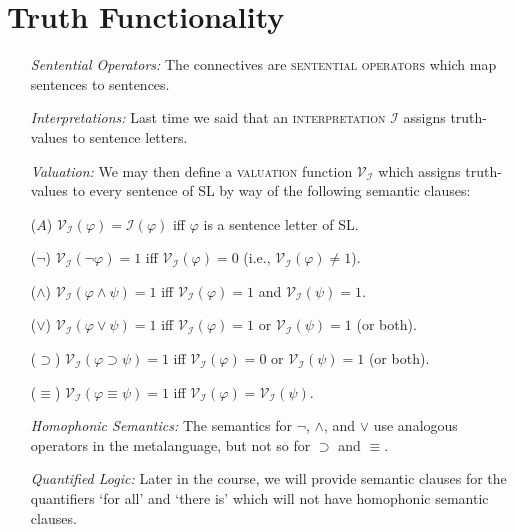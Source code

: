 \documentclass[a4paper, 11pt]{article} %
\newcommand{\I}{\mathcal{I}}
\newcommand{\V}[1]{\mathcal{V}_{#1}} %
\begin{document}
\section*{Truth Functionality}

\begin{enumerate}[leftmargin=1.5in,labelsep=.15in] %
  \item[\it Sentential Operators:] The connectives are \textsc{sentential operators} which map sentences to sentences.
  \item[\it Interpretations:] Last time we said that an \textsc{interpretation} $\I$ assigns truth-values to sentence letters.
  \item[\it Valuation:] We may then define a \textsc{valuation} function $\V{\I}$ which assigns truth-values to every sentence of SL by way of the following semantic clauses:
    \item[($A$)] $\V{\I}(\varphi)=\I(\varphi)$ iff $\varphi$ is a sentence letter of SL.
    \item[($\neg$)] $\V{\I}(\neg\varphi)=1$ iff $\V{\I}(\varphi)=0$ (i.e., $\V{\I}(\varphi)\neq 1$).
    \item[($\wedge$)] $\V{\I}(\varphi \wedge \psi)=1$ iff $\V{\I}(\varphi)=1$ and $\V{\I}(\psi)=1$.
    \item[($\vee$)] $\V{\I}(\varphi \vee \psi)=1$ iff $\V{\I}(\varphi)=1$ or $\V{\I}(\psi)=1$ (or both).
    \item[($\supset$)] $\V{\I}(\varphi \supset \psi)=1$ iff $\V{\I}(\varphi)=0$ or $\V{\I}(\psi)=1$ (or both).
    \item[($\equiv$)] $\V{\I}(\varphi \equiv \psi)=1$ iff $\V{\I}(\varphi)=\V{\I}(\psi)$.
  \item[\it Homophonic Semantics:] The semantics for $\neg$, $\wedge$, and $\vee$ use analogous operators in the metalanguage, but not so for $\supset$ and $\equiv$. 
  \item[\it Quantified Logic:] Later in the course, we will provide semantic clauses for the quantifiers `for all' and `there is' which will not have homophonic semantic clauses.
\end{enumerate}
\end{document}
